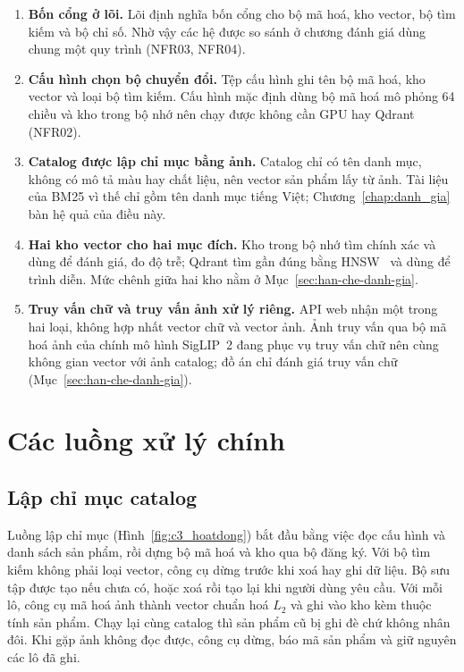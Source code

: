 \begin{enumerate}
\setlength{\itemsep}{2pt}
\item \textbf{Bốn cổng ở lõi.} Lõi định nghĩa bốn cổng cho bộ mã hoá, kho vector, bộ tìm kiếm và bộ chỉ số. Nhờ vậy các hệ được so sánh ở chương đánh giá dùng chung một quy trình (NFR03, NFR04).
\item \textbf{Cấu hình chọn bộ chuyển đổi.} Tệp cấu hình ghi tên bộ mã hoá, kho vector và loại bộ tìm kiếm. Cấu hình mặc định dùng bộ mã hoá mô phỏng 64 chiều và kho trong bộ nhớ nên chạy được không cần GPU hay Qdrant (NFR02).
\item \textbf{Catalog được lập chỉ mục bằng ảnh.} Catalog chỉ có tên danh mục, không có mô tả màu hay chất liệu, nên vector sản phẩm lấy từ ảnh. Tài liệu của BM25 vì thế chỉ gồm tên danh mục tiếng Việt; Chương~\ref{chap:danh_gia} bàn hệ quả của điều này.
\item \textbf{Hai kho vector cho hai mục đích.} Kho trong bộ nhớ tìm chính xác và dùng để đánh giá, đo độ trễ; Qdrant tìm gần đúng bằng HNSW~\cite{malkov2020hnsw} và dùng để trình diễn. Mức chênh giữa hai kho nằm ở Mục~\ref{sec:han-che-danh-gia}.
\item \textbf{Truy vấn chữ và truy vấn ảnh xử lý riêng.} API web nhận một trong hai loại, không hợp nhất vector chữ và vector ảnh. Ảnh truy vấn qua bộ mã hoá ảnh của chính mô hình SigLIP~2 đang phục vụ truy vấn chữ nên cùng không gian vector với ảnh catalog; đồ án chỉ đánh giá truy vấn chữ (Mục~\ref{sec:han-che-danh-gia}).
\end{enumerate}

\section{Các luồng xử lý chính}
\label{sec:luong-xu-ly}

\subsection{Lập chỉ mục catalog}

Luồng lập chỉ mục (Hình~\ref{fig:c3_hoatdong}) bắt đầu bằng việc đọc cấu hình và danh sách sản phẩm, rồi dựng bộ mã hoá và kho qua bộ đăng ký. Với bộ tìm kiếm không phải loại vector, công cụ dừng trước khi xoá hay ghi dữ liệu. Bộ sưu tập được tạo nếu chưa có, hoặc xoá rồi tạo lại khi người dùng yêu cầu. Với mỗi lô, công cụ mã hoá ảnh thành vector chuẩn hoá $L_2$ và ghi vào kho kèm thuộc tính sản phẩm. Chạy lại cùng catalog thì sản phẩm cũ bị ghi đè chứ không nhân đôi. Khi gặp ảnh không đọc được, công cụ dừng, báo mã sản phẩm và giữ nguyên các lô đã ghi.

